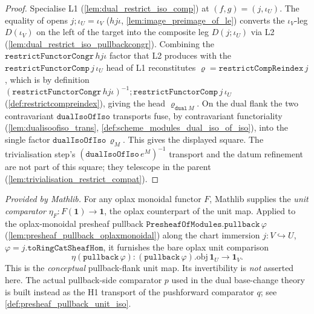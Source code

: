 \begin{proof}
  Specialise L1 (\cref{lem:dual_restrict_iso_comp}) at \((f, g) = (j, \iota_U)\). The equality of opens
  \(j \mathbin{;} \iota_U = \iota_V\) (\(hjι\), \cref{lem:image_preimage_of_le}) converts the
  \(\iota_V\)-leg \(D(\iota_V)\) on the left of the target into the composite leg \(D(j\mathbin{;}\iota_U)\)
  via L2 (\cref{lem:dual_restrict_iso_pullbackcongr}). Combining the \(\mathtt{restrictFunctorCongr}\,hjι\)
  factor that L2 produces with the \(\mathtt{restrictFunctorComp}\,j\,\iota_U\) head of L1 reconstitutes
  \(\varrho = \mathtt{restrictCompReindex}\,j\), which is by definition
  \((\mathtt{restrictFunctorCongr}\,hjι)^{-1} \mathbin{;} \mathtt{restrictFunctorComp}\,j\,\iota_U\)
  (\cref{def:restrictcompreindex}), giving the head \(\varrho_{\mathtt{dual}\,M}\). On the dual flank the
  two contravariant \(\mathtt{dualIsoOfIso}\) transports fuse, by contravariant functoriality
  (\cref{lem:dualisoofiso_trans}, \cref{def:scheme_modules_dual_iso_of_iso}), into the single factor
  \(\mathtt{dualIsoOfIso}\,\varrho_M\). This gives the displayed square. The trivialisation
  step's \((\mathtt{dualIsoOfIso}\,e^M)^{-1}\) transport and the datum refinement are not part of this
  square; they telescope in the parent (\cref{lem:trivialisation_restrict_compat}).
\end{proof}

\begin{definition}
  \label{def:presheaf_pullback_unit_eta}
  \mathlibok
  \textit{Provided by Mathlib.}
  For any oplax monoidal functor \(F\), Mathlib supplies the \emph{unit comparator}
  \(\eta_F : F(\mathbf 1) \to \mathbf 1\), the oplax counterpart of the unit map. Applied to the
  oplax-monoidal presheaf pullback \(\mathtt{PresheafOfModules.pullback}\,\varphi\)
  (\cref{lem:presheaf_pullback_oplaxmonoidal}) along the chart immersion
  \(j : V \hookrightarrow U\), \(\varphi = j.\mathtt{toRingCatSheafHom}\), it furnishes the bare
  oplax unit comparison
  \[
    \eta(\mathtt{pullback}\,\varphi) :
      (\mathtt{pullback}\,\varphi).\mathrm{obj}\,\mathbf 1_U \longrightarrow \mathbf 1_V .
  \]
  This is the \emph{conceptual} pullback-flank unit map. Its invertibility is \emph{not} asserted
  here. The actual pullback-side comparator \(p\) used in the dual base-change theory is built
  instead as
  the H1 transport of the pushforward comparator \(q\); see
  \cref{def:presheaf_pullback_unit_iso}.
\end{definition}

